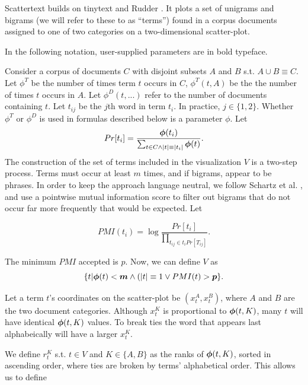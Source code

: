 \documentclass[11pt]{article}
\begin{document}
Scattertext builds on tinytext and Rudder .  It plots a set of unigrams and bigrams (we will refer to these to as ``terms'') found in a corpus documents assigned to one of two categories on a two-dimensional scatter-plot.  

In the following notation, user-supplied parameters are in bold typeface. 

Consider a corpus of documents $C$ with disjoint subsets $A$ and $B$ s.t. $A \cup B \equiv C$. Let $\phi^T$ be the number of times term $t$ occurs in $C$, $\phi^{T}(t,A)$ be the the number of times $t$ occurs in $A$. Let $\phi^{D}(t,...)$ refer to the number of documents containing $t$.  Let $t_{ij}$ be the $j$th word in term $t_i$.  In practice, $j \in \{1,2\}$.   Whether $\phi^T$ or $\phi^D$ is used in formulas described below is a parameter \mbox{\boldmath$\phi$}.  Let
\vspace{-.2cm}
$$Pr[t_i] = \frac{\mbox{\boldmath$\phi$}(t_i)}{\sum_{t \in C\wedge|t|\equiv|t_i|} \mbox{\boldmath$\phi$}(t)}.$$
\vspace{-.2cm}
The construction of the set of terms included in the visualization $V$ is a two-step process. Terms must occur at least \mbox{\boldmath$m$} times, and if bigrams, appear to be phrases.  In order to keep the approach language neutral, we follow Schartz et al. , and use a pointwise mutual information score to filter out bigrams that do not occur far more frequently that would be expected.  Let

\vspace{-.2cm}
$$PMI(t_i) = \log \frac{Pr[t_i]}{\prod_{t_{ij}\in t_i{Pr[T_{ij}]}}}.$$
\vspace{-.2cm}

The minimum $PMI$ accepted is \mbox{\boldmath$p$}. Now, we can define $V$ as 
\vspace{-.2cm}
$$\{t|\mbox{\boldmath$\phi$}(t)<\mbox{\boldmath$m$} \wedge (|t| \equiv 1 \vee PMI(t) > \mbox{\boldmath$p$}\}.$$
\vspace{-.2cm}

Let a term $t$'s coordinates on the scatter-plot be $(x^{A}_{t}, x^{B}_t)$, where $A$ and $B$ are the two document categories. Although $x^{K}_t$ is proportional to $\mbox{\boldmath$\phi$}(t,K)$, many $t$ will have identical $\mbox{\boldmath$\phi$}(t,K)$ values.  To break ties the word that appears last alphabeically will have a larger $x^{K}_t$.

We define $r^{K}_t$ s.t. $t \in V$ and $K \in \{A,B\}$ as the ranks of $\mbox{\boldmath$\phi$}(t,K)$, sorted in ascending order, where ties are broken by terms' alphabetical order.  This allows us to define 
\end{document}
